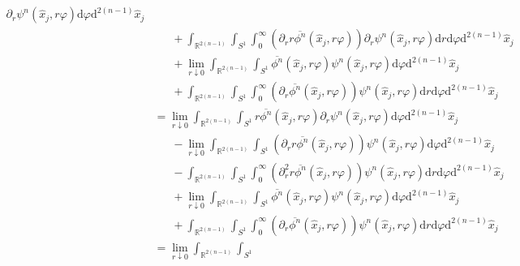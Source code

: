 \begin{align*}
  \partial_{r}
  \psi^{n}(\hat{x}_{j},r\varphi)
  \mathrm{d}\varphi
  \mathrm{d}^{2(n-1)}\hat{x}_{j}
  \\
  &\phantom{=\ }
  +
  \int_{\mathbb{R}^{2(n-1)}}
  \int_{S^{1}}
  \int_{0}^{\infty}
  \left(
    \partial_{r}
    r
    \overline{\phi^{n}}(\hat{x}_{j},r\varphi)
  \right)
  \partial_{r}
  \psi^{n}(\hat{x}_{j},r\varphi)
  \mathrm{d}r
  \mathrm{d}\varphi
  \mathrm{d}^{2(n-1)}\hat{x}_{j}
  \\
  &\phantom{=\ }
  +
  \lim_{r \downarrow 0}
  \int_{\mathbb{R}^{2(n-1)}}
  \int_{S^{1}}
  \overline{\phi^{n}}(\hat{x}_{j},r\varphi)
  \psi^{n}(\hat{x}_{j},r\varphi)
  \mathrm{d}\varphi
  \mathrm{d}^{2(n-1)}\hat{x}_{j}
  \\
  &\phantom{=\ }
  +
  \int_{\mathbb{R}^{2(n-1)}}
  \int_{S^{1}}
  \int_{0}^{\infty}
  \left(
    \partial_{r}
    \overline{\phi^{n}}(\hat{x}_{j},r\varphi)
  \right)
  \psi^{n}(\hat{x}_{j},r\varphi)
  \mathrm{d}r
  \mathrm{d}\varphi
  \mathrm{d}^{2(n-1)}\hat{x}_{j}
  \\
  &=
  \lim_{r \downarrow 0}
  \int_{\mathbb{R}^{2(n-1)}}
  \int_{S^{1}}
  r
  \overline{\phi^{n}}(\hat{x}_{j},r\varphi)
  \partial_{r}
  \psi^{n}(\hat{x}_{j},r\varphi)
  \mathrm{d}\varphi
  \mathrm{d}^{2(n-1)}\hat{x}_{j}
  \\
  &\phantom{=\ }
  -
  \lim_{r \downarrow 0}
  \int_{\mathbb{R}^{2(n-1)}}
  \int_{S^{1}}
  \left(
    \partial_{r}
    r
    \overline{\phi^{n}}(\hat{x}_{j},r\varphi)
  \right)
  \psi^{n}(\hat{x}_{j},r\varphi)
  \mathrm{d}\varphi
  \mathrm{d}^{2(n-1)}\hat{x}_{j}
  \\
  &\phantom{=\ }
  -
  \int_{\mathbb{R}^{2(n-1)}}
  \int_{S^{1}}
  \int_{0}^{\infty}
  \left(
    \partial_{r}^{2}
    r
    \overline{\phi^{n}}(\hat{x}_{j},r\varphi)
  \right)
  \psi^{n}(\hat{x}_{j},r\varphi)
  \mathrm{d}r
  \mathrm{d}\varphi
  \mathrm{d}^{2(n-1)}\hat{x}_{j}
  \\
  &\phantom{=\ }
  +
  \lim_{r \downarrow 0}
  \int_{\mathbb{R}^{2(n-1)}}
  \int_{S^{1}}
  \overline{\phi^{n}}(\hat{x}_{j},r\varphi)
  \psi^{n}(\hat{x}_{j},r\varphi)
  \mathrm{d}\varphi
  \mathrm{d}^{2(n-1)}\hat{x}_{j}
  \\
  &\phantom{=\ }
  +
  \int_{\mathbb{R}^{2(n-1)}}
  \int_{S^{1}}
  \int_{0}^{\infty}
  \left(
    \partial_{r}
    \overline{\phi^{n}}(\hat{x}_{j},r\varphi)
  \right)
  \psi^{n}(\hat{x}_{j},r\varphi)
  \mathrm{d}r
  \mathrm{d}\varphi
  \mathrm{d}^{2(n-1)}\hat{x}_{j}
  \\
  &=
  \lim_{r \downarrow 0}
  \int_{\mathbb{R}^{2(n-1)}}
  \int_{S^{1}}

\end{align*}
